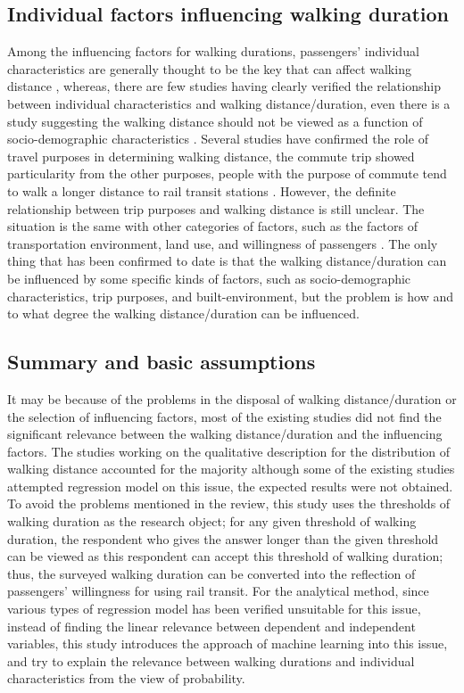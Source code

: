 \documentclass[sustainability,article,submit,moreauthors,pdftex,10pt,a4paper]{Definitions/mdpi}
\begin{document}
\subsection{Individual factors influencing walking duration}
%
Among the influencing factors for walking durations, passengers' individual characteristics are generally thought to be the key that can affect walking distance \cite{besser2005walking,weinstein2008far,krygsman2004multimodal,yang2012walking,daniels2013explaining,guerra2012half}, whereas, there are few studies having clearly verified the relationship between individual characteristics and walking distance/duration, even there is a study suggesting the walking distance should not be viewed as a function of socio-demographic characteristics \cite{krygsman2004multimodal}. Several studies have confirmed the role of travel purposes in determining walking distance, the commute trip showed particularity from the other purposes, people with the purpose of commute tend to walk a longer distance to rail transit stations \cite{larsen2010beyond}. However, the definite relationship between trip purposes and walking distance is still unclear. The situation is the same with other categories of factors, such as the factors of transportation environment, land use, and willingness of passengers \cite{guerra2012half,krygsman2004multimodal,weinstein2008far}. The only thing that has been confirmed to date is that the walking distance/duration can be influenced by some specific kinds of factors, such as socio-demographic characteristics, trip purposes, and built-environment, but the problem is how and to what degree the walking distance/duration can be influenced.

%
\subsection{Summary and basic assumptions}
%
It may be because of the problems in the disposal of walking distance/duration or the selection of influencing factors, most of the existing studies did not find the significant relevance between the walking distance/duration and the influencing factors. The studies working on the qualitative description for the distribution of walking distance accounted for the majority although some of the existing studies attempted regression model on this issue, the expected results were not obtained. To avoid the problems mentioned in the review, this study uses the thresholds of walking duration as the research object; for any given threshold of walking duration, the respondent who gives the answer longer than the given threshold can be viewed as this respondent can accept this threshold of walking duration; thus, the surveyed walking duration can be converted into the reflection of passengers' willingness for using rail transit. For the analytical method, since various types of regression model has been verified unsuitable for this issue, instead of finding the linear relevance between dependent and independent variables, this study introduces the approach of machine learning into this issue, and try to explain the relevance between walking durations and individual characteristics from the view of probability.
\end{document}
